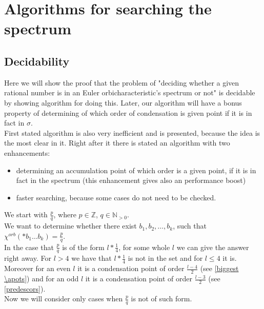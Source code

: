 \chapter{Algorithms for searching the spectrum}

\section{Decidability}
Here we will show the proof that the problem of "deciding whether a given rational number is in an 
Euler orbicharacteristic's spectrum or not" is decidable by showing algorithm for doing this. 
Later, our algorithm will have a bonus property of determining of which order of condensation 
is given point if it is in fact in $\sigma$. \\
First stated algorithm is also very inefficient and is presented, because the idea is the most 
clear in it. Right after it there is stated an algorithm with two enhancements: 
\begin{itemize}
\item determining an accumulation point of which order is a given point, if it is in fact in the 
spectrum (this enhancement gives also an performance boost)
\item faster searching, because some cases do not need to be checked. 
\end{itemize}
We start with $\frac{p}{q}$, where $p \in \mathbb{Z}$, $q \in \mathbb{N}_{>0}$. \\ 

We want to determine whether there exist $b_1,b_2,\dots,b_k$, such that $\chi^{orb}(*b_1\dots b_k) = 
\frac{p}{q}$. \\ 

In the case that $\frac{p}{q}$ is of the form $l*\frac{1}{4}$, for some whole $l$ 
we can give the answer right away. For $l > 4$ we have that $l*\frac{1}{4}$ is not in the set 
and for $l \leq 4$ it is. Moreover for an even $l$ it is a condensation point of order 
$\frac{l-4}{2}$ (see \ref{biggest \apots})
and for an odd $l$ it is a condensation point of order $\frac{l-3}{2}$ (see \ref{predescors}). \\

Now we will consider only cases when $\frac{p}{q}$ is not of such form. \\ 

